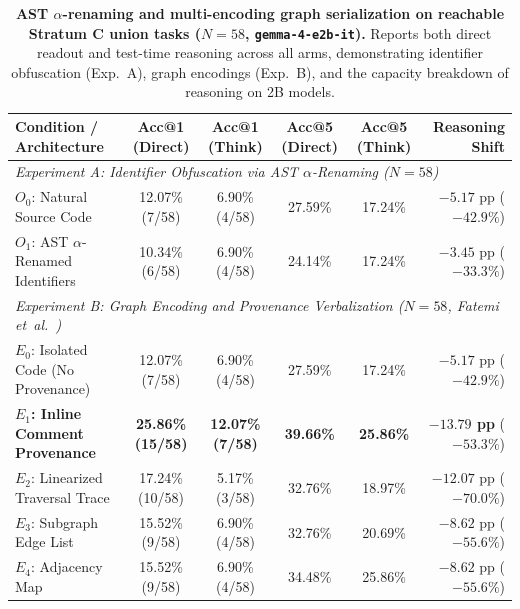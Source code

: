 \documentclass[10pt]{article}
\begin{document}
\begin{table}[!t]
\centering
\scriptsize
\setlength{\tabcolsep}{5.0pt}
\renewcommand{\arraystretch}{0.94}
\caption{\textbf{AST $\alpha$-renaming and multi-encoding graph serialization on reachable Stratum C union tasks ($N=58$, \texttt{gemma-4-e2b-it}).} Reports both direct readout and test-time reasoning across all arms, demonstrating identifier obfuscation (Exp.\ A), graph encodings (Exp.\ B), and the capacity breakdown of reasoning on 2B models.}
\label{tab:causal_ablation}
\begin{tabular}{l c c c c r}
\toprule
\textbf{Condition / Architecture} & \textbf{Acc@1 (Direct)} & \textbf{Acc@1 (Think)} & \textbf{Acc@5 (Direct)} & \textbf{Acc@5 (Think)} & \textbf{Reasoning Shift} \\
\midrule
\multicolumn{6}{l}{\textit{Experiment A: Identifier Obfuscation via AST $\alpha$-Renaming ($N=58$)}} \\
$O_0$: Natural Source Code & 12.07\% (7/58) & 6.90\% (4/58) & 27.59\% & 17.24\% & $-5.17$ pp ($-42.9\%$) \\
$O_1$: AST $\alpha$-Renamed Identifiers & 10.34\% (6/58) & 6.90\% (4/58) & 24.14\% & 17.24\% & $-3.45$ pp ($-33.3\%$) \\
\midrule
\multicolumn{6}{l}{\textit{Experiment B: Graph Encoding and Provenance Verbalization ($N=58$, Fatemi et~al.~\cite{fatemi2023talk})}} \\
$E_0$: Isolated Code (No Provenance) & 12.07\% (7/58) & 6.90\% (4/58) & 27.59\% & 17.24\% & $-5.17$ pp ($-42.9\%$) \\
\textbf{$E_1$: Inline Comment Provenance} & \textbf{25.86\% (15/58)} & \textbf{12.07\% (7/58)} & \textbf{39.66\%} & \textbf{25.86\%} & \textbf{$-13.79$ pp} ($-53.3\%$) \\
$E_2$: Linearized Traversal Trace & 17.24\% (10/58) & 5.17\% (3/58) & 32.76\% & 18.97\% & $-12.07$ pp ($-70.0\%$) \\
$E_3$: Subgraph Edge List & 15.52\% (9/58) & 6.90\% (4/58) & 32.76\% & 20.69\% & $-8.62$ pp ($-55.6\%$) \\
$E_4$: Adjacency Map & 15.52\% (9/58) & 6.90\% (4/58) & 34.48\% & 25.86\% & $-8.62$ pp ($-55.6\%$) \\
\bottomrule
\end{tabular}
\end{table}
\end{document}

